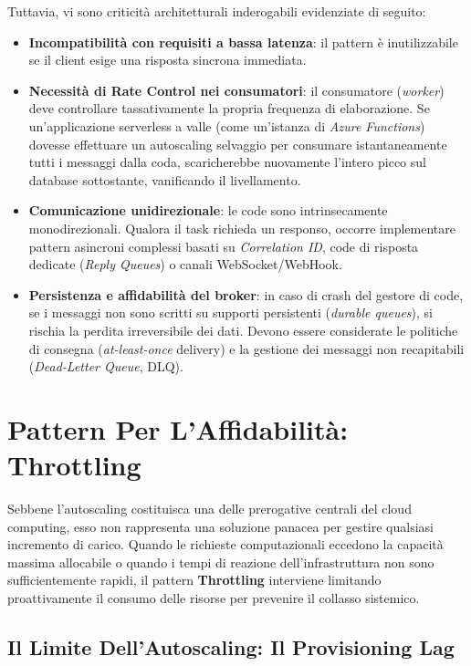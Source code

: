 \documentclass[11pt, a4paper]{article}
\begin{document}
Tuttavia, vi sono criticità architetturali inderogabili evidenziate di seguito:
\begin{itemize}[noitemsep]
    \item \textbf{Incompatibilità con requisiti a bassa latenza}: il pattern è inutilizzabile se il client esige una risposta sincrona immediata.
    \item \textbf{Necessità di Rate Control nei consumatori}: il consumatore (\emph{worker}) deve controllare tassativamente la propria frequenza di elaborazione. Se un'applicazione serverless a valle (come un'istanza di \emph{Azure Functions}) dovesse effettuare un autoscaling selvaggio per consumare istantaneamente tutti i messaggi dalla coda, scaricherebbe nuovamente l'intero picco sul database sottostante, vanificando il livellamento.
    \item \textbf{Comunicazione unidirezionale}: le code sono intrinsecamente monodirezionali. Qualora il task richieda un responso, occorre implementare pattern asincroni complessi basati su \emph{Correlation ID}, code di risposta dedicate (\emph{Reply Queues}) o canali WebSocket/WebHook.
    \item \textbf{Persistenza e affidabilità del broker}: in caso di crash del gestore di code, se i messaggi non sono scritti su supporti persistenti (\emph{durable queues}), si rischia la perdita irreversibile dei dati. Devono essere considerate le politiche di consegna (\emph{at-least-once} delivery) e la gestione dei messaggi non recapitabili (\emph{Dead-Letter Queue}, DLQ).
\end{itemize}

\newpage

\section{Pattern Per L'Affidabilità: Throttling}

Sebbene l'autoscaling costituisca una delle prerogative centrali del cloud computing, esso non rappresenta una soluzione panacea per gestire qualsiasi incremento di carico. Quando le richieste computazionali eccedono la capacità massima allocabile o quando i tempi di reazione dell'infrastruttura non sono sufficientemente rapidi, il pattern \textbf{Throttling} interviene limitando proattivamente il consumo delle risorse per prevenire il collasso sistemico.

\subsection{Il Limite Dell'Autoscaling: Il Provisioning Lag}
\end{document}
